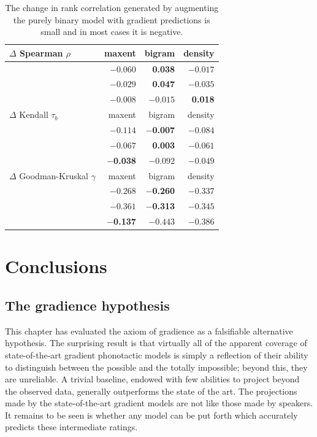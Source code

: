 \begin{table} \centering
\begin{tabular}{l r r r}
\toprule
$\Delta$ Spearman $\rho$          & maxent            & bigram            & density  \\
\midrule
\citealt{Greenberg1964}  & $-0.060$          &  \textbf{0.038} & $-0.017$ \\
\citealt{Scholes1966}    & $-0.029$          &  \textbf{0.047} & $-0.035$ \\
\citealt{Albright2003b}  & $-0.008$          & $-0.015$          & \textbf{0.018} \\
\midrule
$\Delta$ Kendall $\tau_b$         & maxent            & bigram            & density  \\
\midrule
\citealt{Greenberg1964}  & $-0.114$          & \textbf{$-$0.007} & $-0.084$ \\
\citealt{Scholes1966}    & $-0.067$          & \textbf{0.003}  & $-0.061$ \\
\citealt{Albright2003b}  & \textbf{$-$0.038} & $-0.092$          & $-0.049$ \\
\midrule
$\Delta$ Goodman-Kruskal $\gamma$ & maxent            & bigram            & density  \\
\midrule
\citealt{Greenberg1964}  & $-0.268$          & \textbf{$-$0.260} & $-0.337$ \\
\citealt{Scholes1966}    & $-0.361$          & \textbf{$-$0.313} & $-0.345$ \\
\citealt{Albright2003b}  & \textbf{$-$0.137} & $-0.443$          & $-0.386$ \\
\bottomrule
\end{tabular}
\caption{The change in rank correlation generated by augmenting the purely binary model with gradient predictions is small and in most cases it is negative.}
\label{controlled}
\end{table}

\section{Conclusions}

\subsection{The gradience hypothesis}

This chapter has evaluated the axiom of gradience as a falsifiable alternative hypothesis. The surprising result is that virtually all of the apparent coverage of state-of-the-art gradient phonotactic models is simply a reflection of their ability to distinguish between the possible and the totally impossible; beyond this, they are unreliable. A trivial baseline, endowed with few abilities to project beyond the observed data, generally outperforms the state of the art. The projections made by the state-of-the-art gradient models are not like those made by speakers. It remains to be seen is whether any model can be put forth which accurately predicts these intermediate ratings.

